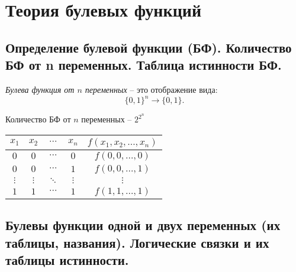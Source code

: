 \section{Теория булевых функций}

\subsection{Определение булевой функции (БФ). Количество БФ от n переменных. Таблица истинности БФ.}

\begin{definition}
    \emph{Булева функция от $n$ переменных} -- это отображение вида:
    \[
        \{0,1\}^n \rightarrow \{0,1\}.
    \]
\end{definition}

\begin{remark}
    Количество БФ от $n$ переменных -- $2^{2^n}$

    \begin{center}
        \begin{tabular}{c c c c | c}
            $x_1$    & $x_2$    & $\cdots$ & $x_n$    & $f(x_1,x_2,\ldots,x_n)$ \\ [0.5ex]
            \hline
            $0$      & $0$      & $\cdots$ & $0$      & $f(0,0,\ldots,0)$       \\
            $0$      & $0$      & $\cdots$ & $1$      & $f(0,0,\ldots,1)$       \\
            $\vdots$ & $\vdots$ & $\ddots$ & $\vdots$ & $\vdots$                \\
            $1$      & $1$      & $\cdots$ & $1$      & $f(1,1,\ldots,1)$
        \end{tabular}
        \label{table:1}
    \end{center}
\end{remark}

\subsection{Булевы функции одной и двух переменных (их таблицы, названия). Логические связки и их таблицы истинности.}

